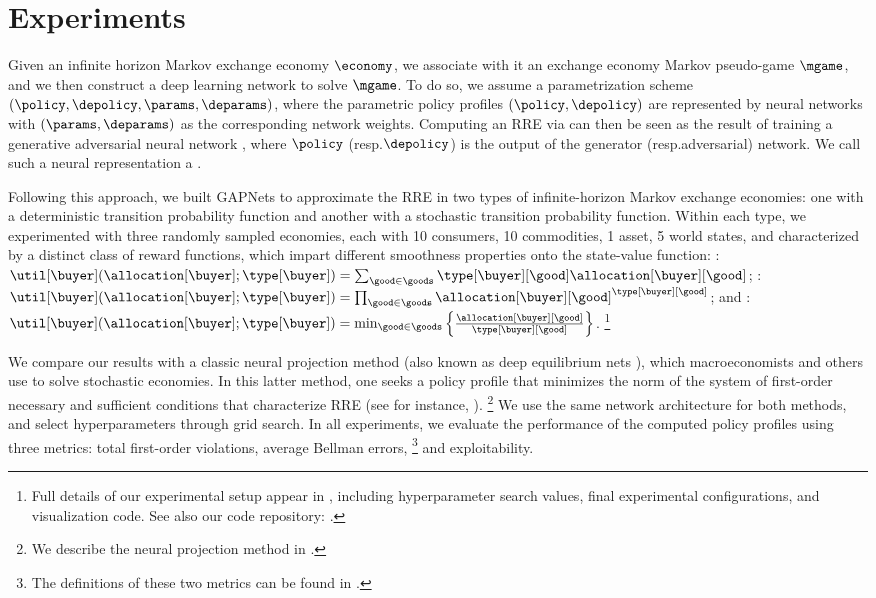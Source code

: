 \section{Experiments}
\label{sec:expts}

Given an infinite horizon Markov exchange economy $\economy$, we associate with it an exchange economy Markov pseudo-game $\mgame$, and we then construct a deep learning network to solve $\mgame$.
To do so, we assume a parametrization scheme $(\policy, \depolicy, \params, \deparams)$, where the parametric policy profiles $(\policy, \depolicy)$ are represented by neural networks with $(\params, \deparams)$ as the corresponding network weights.
Computing an RRE via  can then be seen as the result of training a generative adversarial neural network \cite{goodfellow2014gan}, where $\policy$ (resp.\@ $\depolicy$) is the output of the generator (resp.\@ adversarial) network.
We call such a neural representation a .

Following this approach, we built GAPNets to approximate the RRE in two types of infinite-horizon Markov exchange economies: one with a deterministic transition probability function and another with a stochastic transition probability function. 
Within each type, we experimented with three randomly sampled economies, each with 10 consumers, 10 commodities, 1 asset, 5 world states, and characterized by a distinct class of reward functions, which impart different smoothness properties onto the state-value function: 
: $\util[\buyer](\allocation[\buyer]; \type[\buyer]) = \sum_{\good \in \goods} \type[\buyer][\good] \allocation[\buyer][\good]$; 
:  $\util[\buyer](\allocation[\buyer]; \type[\buyer]) = \prod_{\good \in \goods} {\allocation[\buyer][\good]}^{\type[\buyer][\good]}$; 
and :  $\util[\buyer](\allocation[\buyer]; \type[\buyer]) = \min_{\good \in \goods} \left\{ \frac{\allocation[\buyer][\good]}{\type[\buyer][\good]}\right\}$. 
%
\footnote{Full details of our experimental setup appear in , including hyperparameter search values, final experimental configurations, and visualization code.
See also our code repository: \texttt{\coderepo}.} 

We compare our results with a classic neural projection method (also known as deep equilibrium nets \cite{azinovic2022deep}), which macroeconomists and others use to solve stochastic economies.
In this latter method, one seeks a policy profile that minimizes the norm of the system of first-order necessary and sufficient conditions that characterize RRE
(see for instance, \cite{FernandezVillaverde2023CompMethodsMacro}).%
\footnote{We describe the neural projection method in .}
We use the same network architecture for both methods, and select hyperparameters through grid search.
In all experiments, we evaluate the performance of the computed policy profiles using three metrics: total first-order violations, average Bellman errors,%
\footnote{The definitions of these two metrics can be found in .} 
and exploitability. 

